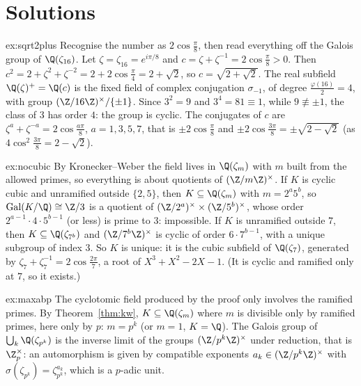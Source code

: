 \section{Solutions}

\begin{solution}{ex:sqrt2plus}
\idea Recognise the number as $2\cos\frac{\pi}{8}$, then read everything off the Galois group of $\Q(\zeta_{16})$.
\writeup Let $\zeta=\zeta_{16}=e^{i\pi/8}$ and $c=\zeta+\zeta^{-1}=2\cos\frac\pi8>0$. Then $c^2=2+\zeta^2+\zeta^{-2}=2+2\cos\frac\pi4=2+\sqrt2$, so $c=\sqrt{2+\sqrt2}$.
The real subfield $\Q(\zeta)^+=\Q(c)$ is the fixed field of complex conjugation $\sigma_{-1}$, of degree $\frac{\varphi(16)}2=4$, with group
$(\Z/16\Z)^\times/\{\pm1\}$. Since $3^2=9$ and $3^4=81\equiv1$, while $9\not\equiv\pm1$, the class of $3$ has order $4$: the group is cyclic. The conjugates of $c$
are $\zeta^a+\zeta^{-a}=2\cos\frac{a\pi}8$, $a=1,3,5,7$, that is $\pm2\cos\frac\pi8$ and $\pm2\cos\frac{3\pi}8=\pm\sqrt{2-\sqrt2}$ (as $4\cos^2\frac{3\pi}8=2-\sqrt2$).
\end{solution}

\begin{solution}{ex:nocubic}
\idea By Kronecker--Weber the field lives in $\Q(\zeta_m)$ with $m$ built from the allowed primes, so everything is about quotients of $(\Z/m\Z)^\times$.
\writeup If $K$ is cyclic cubic and unramified outside $\{2,5\}$, then $K\subseteq\Q(\zeta_m)$ with $m=2^a5^b$, so $\operatorname{Gal}(K/\Q)\cong\Z/3$ is a quotient of
$(\Z/2^a)^\times\times(\Z/5^b)^\times$, whose order $2^{a-1}\cdot4\cdot5^{b-1}$ (or less) is prime to $3$: impossible. If $K$ is unramified outside $7$, then
$K\subseteq\Q(\zeta_{7^b})$ and $(\Z/7^b\Z)^\times$ is cyclic of order $6\cdot7^{b-1}$, with a unique subgroup of index $3$. So $K$ is unique: it is the cubic
subfield of $\Q(\zeta_7)$, generated by $\zeta_7+\zeta_7^{-1}=2\cos\frac{2\pi}7$, a root of $X^3+X^2-2X-1$. (It is cyclic and ramified only at $7$, so it exists.)
\end{solution}

\begin{solution}{ex:maxabp}
\idea The cyclotomic field produced by the proof only involves the ramified primes.
\writeup By Theorem~\ref{thm:kw}, $K\subseteq\Q(\zeta_m)$ where $m$ is divisible only by ramified primes, here only by $p$: $m=p^k$ (or $m=1$, $K=\Q$). The Galois
group of $\bigcup_k\Q(\zeta_{p^k})$ is the inverse limit of the groups $(\Z/p^k\Z)^\times$ under reduction, that is $\Z_p^\times$: an automorphism is given by
compatible exponents $a_k\in(\Z/p^k\Z)^\times$ with $\sigma(\zeta_{p^k})=\zeta_{p^k}^{a_k}$, which is a $p$-adic unit.
\end{solution}

